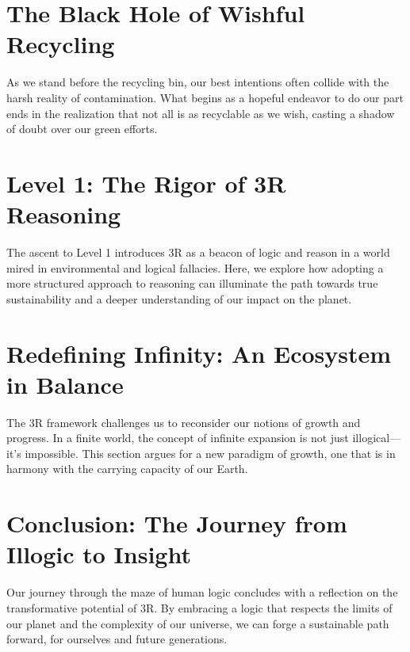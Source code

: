 \documentclass[12pt]{article}
\begin{document}
\section*{The Black Hole of Wishful Recycling}

As we stand before the recycling bin, our best intentions often collide with the harsh reality of contamination. What begins as a hopeful endeavor to do our part ends in the realization that not all is as recyclable as we wish, casting a shadow of doubt over our green efforts.

\section*{Level 1: The Rigor of 3R Reasoning}

The ascent to Level 1 introduces 3R as a beacon of logic and reason in a world mired in environmental and logical fallacies. Here, we explore how adopting a more structured approach to reasoning can illuminate the path towards true sustainability and a deeper understanding of our impact on the planet.

\section*{Redefining Infinity: An Ecosystem in Balance}

The 3R framework challenges us to reconsider our notions of growth and progress. In a finite world, the concept of infinite expansion is not just illogical—it's impossible. This section argues for a new paradigm of growth, one that is in harmony with the carrying capacity of our Earth.

\section*{Conclusion: The Journey from Illogic to Insight}

Our journey through the maze of human logic concludes with a reflection on the transformative potential of 3R. By embracing a logic that respects the limits of our planet and the complexity of our universe, we can forge a sustainable path forward, for ourselves and future generations.


\end{document}
